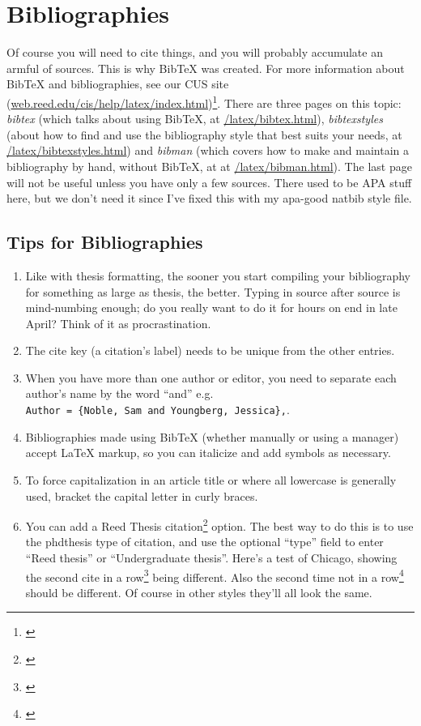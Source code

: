 \documentclass[12pt,twoside]{reedthesis}
\begin{document}
\section{Bibliographies}
Of course you will need to cite things, and you will probably accumulate an armful of sources. This is why BibTeX was created. For more information about BibTeX and bibliographies, see our CUS site (\url{web.reed.edu/cis/help/latex/index.html})\footnote{\cite{reedweb:2007}}. There are three pages on this topic: {\it bibtex} (which talks about using BibTeX, at \url{/latex/bibtex.html}), {\it bibtexstyles} (about how to find and use the bibliography style that best suits your needs, at \url{/latex/bibtexstyles.html}) and {\it bibman} (which covers how to make and maintain a bibliography by hand, without BibTeX, at at \url{/latex/bibman.html}). The last page will not be useful unless you have only a few sources. There used to be APA stuff here, but we don't need it since I've fixed this with my apa-good natbib style file.

\subsection{Tips for Bibliographies}
\begin{enumerate}
	\item Like with thesis formatting, the sooner you start compiling your bibliography for something as large as thesis, the better. Typing in source after source is mind-numbing enough; do you really want to do it for hours on end in late April? Think of it as procrastination.
	\item The cite key (a citation's label) needs to be unique from the other entries.
	\item When you have more than one author or editor, you need to separate each author's name by the word ``and'' e.g.\\ \verb+Author = {Noble, Sam and Youngberg, Jessica},+.
	\item Bibliographies made using BibTeX (whether manually or using a manager) accept LaTeX markup, so you can italicize and add symbols as necessary.
	\item To force capitalization in an article title or where all lowercase is generally used, bracket the capital letter in curly braces.
	\item You can add a Reed Thesis citation\footnote{\cite{noble:2002}} option. The best way to do this is to use the phdthesis type of citation, and use the optional ``type'' field to enter ``Reed thesis'' or ``Undergraduate thesis''. Here's a test of Chicago, showing the second cite in a row\footnote{\cite{noble:2002}} being different. Also the second time not in a row\footnote{\cite{reedweb:2007}} should be different. Of course in other styles they'll all look the same.
\end{enumerate}
\end{document}
